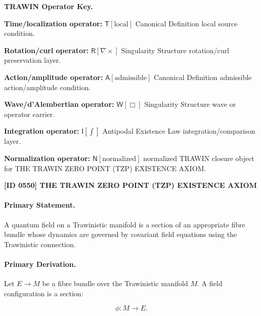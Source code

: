 \par\vspace{0.45\baselineskip}
\noindent\begin{minipage}[t]{\linewidth}
\begingroup
\small
\raggedright
\textbf{TRAWIN Operator Key.}\par
\noindent\textbf{Time/localization operator:} $\mathsf{T}\!\left[\mathrm{local}\right]$ Canonical Definition local source condition.\par
\noindent\textbf{Rotation/curl operator:} $\mathsf{R}\!\left[\nabla\times\right]$ Singularity Structure rotation/curl preservation layer.\par
\noindent\textbf{Action/amplitude operator:} $\mathsf{A}\!\left[\mathrm{admissible}\right]$ Canonical Definition admissible action/amplitude condition.\par
\noindent\textbf{Wave/d'Alembertian operator:} $\mathsf{W}\!\left[\Box\right]$ Singularity Structure wave or operator carrier.\par
\noindent\textbf{Integration operator:} $\mathsf{I}\!\left[\int\right]$ Antipodal Existence Law integration/comparison layer.\par
\noindent\textbf{Normalization operator:} $\mathsf{N}\!\left[\mathrm{normalized}\right]$ normalized TRAWIN closure object for THE TRAWIN ZERO POINT (TZP) EXISTENCE AXIOM.\par
\endgroup
\end{minipage}

\clearpage
\noindent\textbf{[ID 0550] THE TRAWIN ZERO POINT (TZP) EXISTENCE AXIOM}\par
\vspace{0.35em}
\paragraph{Primary Statement.}
A quantum field on a Trawinistic manifold is a section of an appropriate fibre bundle whose dynamics are governed by covariant field equations using the Trawinistic connection.

\paragraph{Primary Derivation.}
Let $E\to M$ be a fibre bundle over the Trawinistic manifold $M$.  
A field configuration is a section:

\begin{equation}
\phi:M\to E .
\end{equation}


